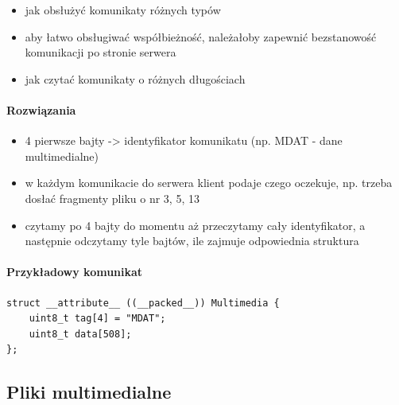 \documentclass[12pt, a4paper]{article}
\providecommand{\tightlist}{%
  \setlength{\itemsep}{0pt}\setlength{\parskip}{0pt}}
\begin{document}
\begin{itemize}
\tightlist
\item
  jak obsłużyć komunikaty różnych typów
\item
  aby łatwo obsługiwać współbieżność, należałoby zapewnić bezstanowość
  komunikacji po stronie serwera
\item
  jak czytać komunikaty o różnych długościach
\end{itemize}

\hypertarget{rozwiux105zania}{%
\paragraph{Rozwiązania}\label{rozwiux105zania}}

\begin{itemize}
\tightlist
\item
  4 pierwsze bajty -\textgreater{} identyfikator komunikatu (np. MDAT -
  dane multimedialne)
\item
  w każdym komunikacie do serwera klient podaje czego oczekuje, np.
  trzeba dosłać fragmenty pliku o nr 3, 5, 13
\item
  czytamy po 4 bajty do momentu aż przeczytamy cały identyfikator, a
  następnie odczytamy tyle bajtów, ile zajmuje odpowiednia struktura
\end{itemize}

\hypertarget{przykux142adowy-komunikat}{%
\paragraph{Przykładowy komunikat}\label{przykux142adowy-komunikat}}

\begin{verbatim}
struct __attribute__ ((__packed__)) Multimedia {
    uint8_t tag[4] = "MDAT";
    uint8_t data[508];
};
\end{verbatim}

\hypertarget{pliki-multimedialne}{%
\subsection{Pliki multimedialne}\label{pliki-multimedialne}}
\end{document}
